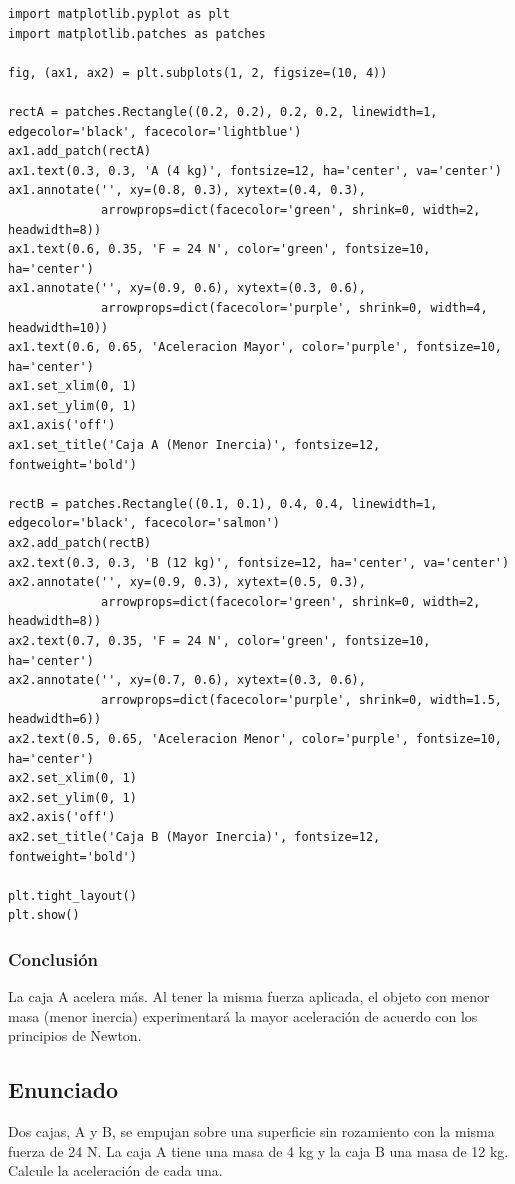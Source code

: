 \documentclass[12pt]{article}
\begin{document}
\begin{lstlisting}
import matplotlib.pyplot as plt
import matplotlib.patches as patches

fig, (ax1, ax2) = plt.subplots(1, 2, figsize=(10, 4))

rectA = patches.Rectangle((0.2, 0.2), 0.2, 0.2, linewidth=1, edgecolor='black', facecolor='lightblue')
ax1.add_patch(rectA)
ax1.text(0.3, 0.3, 'A (4 kg)', fontsize=12, ha='center', va='center')
ax1.annotate('', xy=(0.8, 0.3), xytext=(0.4, 0.3), 
             arrowprops=dict(facecolor='green', shrink=0, width=2, headwidth=8))
ax1.text(0.6, 0.35, 'F = 24 N', color='green', fontsize=10, ha='center')
ax1.annotate('', xy=(0.9, 0.6), xytext=(0.3, 0.6), 
             arrowprops=dict(facecolor='purple', shrink=0, width=4, headwidth=10))
ax1.text(0.6, 0.65, 'Aceleracion Mayor', color='purple', fontsize=10, ha='center')
ax1.set_xlim(0, 1)
ax1.set_ylim(0, 1)
ax1.axis('off')
ax1.set_title('Caja A (Menor Inercia)', fontsize=12, fontweight='bold')

rectB = patches.Rectangle((0.1, 0.1), 0.4, 0.4, linewidth=1, edgecolor='black', facecolor='salmon')
ax2.add_patch(rectB)
ax2.text(0.3, 0.3, 'B (12 kg)', fontsize=12, ha='center', va='center')
ax2.annotate('', xy=(0.9, 0.3), xytext=(0.5, 0.3), 
             arrowprops=dict(facecolor='green', shrink=0, width=2, headwidth=8))
ax2.text(0.7, 0.35, 'F = 24 N', color='green', fontsize=10, ha='center')
ax2.annotate('', xy=(0.7, 0.6), xytext=(0.3, 0.6), 
             arrowprops=dict(facecolor='purple', shrink=0, width=1.5, headwidth=6))
ax2.text(0.5, 0.65, 'Aceleracion Menor', color='purple', fontsize=10, ha='center')
ax2.set_xlim(0, 1)
ax2.set_ylim(0, 1)
ax2.axis('off')
ax2.set_title('Caja B (Mayor Inercia)', fontsize=12, fontweight='bold')

plt.tight_layout()
plt.show()
\end{lstlisting}

\subsubsection*{Conclusión}
La caja A acelera más. Al tener la misma fuerza aplicada, el objeto con menor masa (menor inercia) experimentará la mayor aceleración de acuerdo con los principios de Newton.

\newpage

\subsection*{Enunciado}
Dos cajas, A y B, se empujan sobre una superficie sin rozamiento con la misma fuerza de 24 N. La caja A tiene una masa de 4 kg y la caja B una masa de 12 kg. Calcule la aceleración de cada una.
\end{document}
